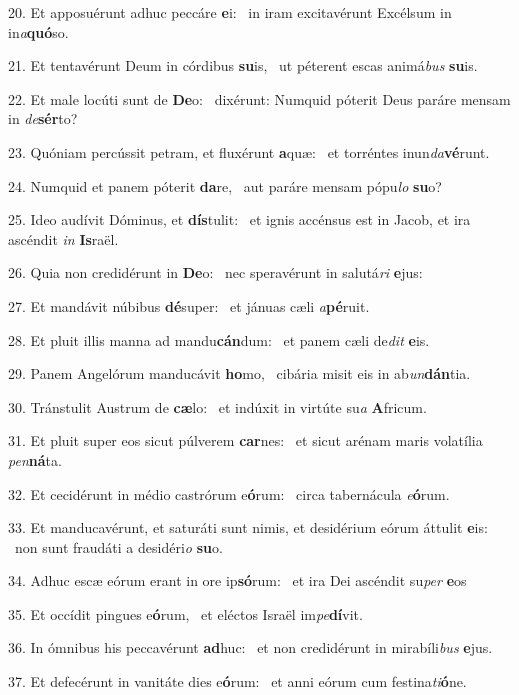 20. Et apposuérunt adhuc peccáre \textbf{e}i: \ast\  in iram excitavérunt Excélsum in in\textit{a}\textbf{quó}so.\

21. Et tentavérunt Deum in córdibus \textbf{su}is, \ast\  ut péterent escas animá\textit{bus} \textbf{su}is.\

22. Et male locúti sunt de \textbf{De}o: \ast\  dixérunt: Numquid póterit Deus paráre mensam in \textit{de}\textbf{sér}to?\

23. Quóniam percússit petram, et fluxérunt \textbf{a}quæ: \ast\  et torréntes inun\textit{da}\textbf{vé}runt.\

24. Numquid et panem póterit \textbf{da}re, \ast\  aut paráre mensam pópu\textit{lo} \textbf{su}o?\

25. Ideo audívit Dóminus, et \textbf{dís}tulit: \ast\  et ignis accénsus est in Jacob, et ira ascéndit \textit{in} \textbf{Is}raël.\

26. Quia non credidérunt in \textbf{De}o: \ast\  nec speravérunt in salutá\textit{ri} \textbf{e}jus:\

27. Et mandávit núbibus \textbf{dé}super: \ast\  et jánuas cæli \textit{a}\textbf{pé}ruit.\

28. Et pluit illis manna ad mandu\textbf{cán}dum: \ast\  et panem cæli de\textit{dit} \textbf{e}is.\

29. Panem Angelórum manducávit \textbf{ho}mo, \ast\  cibária misit eis in ab\textit{un}\textbf{dán}tia.\

30. Tránstulit Austrum de \textbf{cæ}lo: \ast\  et indúxit in virtúte su\textit{a} \textbf{A}fricum.\

31. Et pluit super eos sicut púlverem \textbf{car}nes: \ast\  et sicut arénam maris volatília \textit{pen}\textbf{ná}ta.\

32. Et cecidérunt in médio castrórum e\textbf{ó}rum: \ast\  circa tabernácula \textit{e}\textbf{ó}rum.\

33. Et manducavérunt, et saturáti sunt nimis, et desidérium eórum áttulit \textbf{e}is: \ast\  non sunt fraudáti a desidéri\textit{o} \textbf{su}o.\

34. Adhuc escæ eórum erant in ore ip\textbf{só}rum: \ast\  et ira Dei ascéndit su\textit{per} \textbf{e}os\

35. Et occídit pingues e\textbf{ó}rum, \ast\  et eléctos Israël im\textit{pe}\textbf{dí}vit.\

36. In ómnibus his peccavérunt \textbf{ad}huc: \ast\  et non credidérunt in mirabíli\textit{bus} \textbf{e}jus.\

37. Et defecérunt in vanitáte dies e\textbf{ó}rum: \ast\  et anni eórum cum festina\textit{ti}\textbf{ó}ne.\

